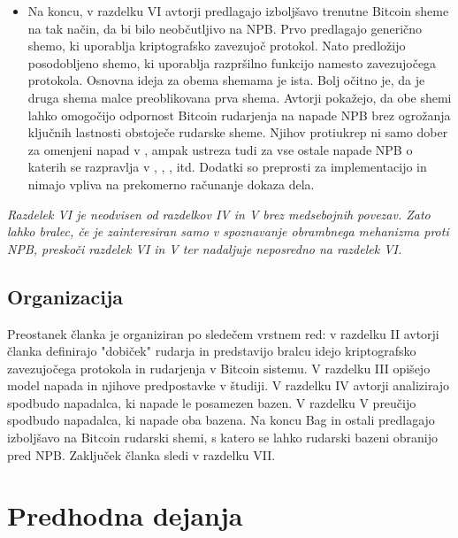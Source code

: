 \documentclass[12pt]{article}
\begin{document}
\begin{itemize}
	\item Na koncu, v razdelku VI avtorji predlagajo izboljšavo trenutne Bitcoin sheme na tak način, da bi bilo neobčutljivo na NPB. Prvo predlagajo generično shemo, ki uporablja kriptografsko zavezujoč protokol. Nato predložijo posodobljeno shemo, ki uporablja razpršilno funkcijo namesto zavezujočega protokola. Osnovna ideja za obema shemama je ista. Bolj očitno je, da je druga shema malce preoblikovana prva shema. Avtorji pokažejo, da obe shemi lahko omogočijo odpornost Bitcoin rudarjenja na napade NPB brez ogrožanja ključnih lastnosti obstoječe rudarske sheme. Njihov protiukrep ni samo dober za omenjeni napad v  \cite{originalarticle}, ampak ustreza tudi za vse ostale napade NPB o katerih se razpravlja v \cite{analysisofbitcoin}, \cite{minnersdilemma}, \cite{subversivestrategies}, itd. Dodatki so preprosti za implementacijo in nimajo vpliva na prekomerno računanje dokaza dela.
\end{itemize}

\textit{
	Razdelek VI je neodvisen od razdelkov IV in V brez medsebojnih povezav. Zato lahko bralec, če je zainteresiran samo v spoznavanje obrambnega mehanizma proti NPB, preskoči razdelek VI in V ter nadaljuje neposredno na razdelek VI. }

\subsection{Organizacija}

Preostanek članka  \cite{originalarticle} je organiziran po sledečem vrstnem red: v razdelku II avtorji članka definirajo "dobiček" rudarja in predstavijo bralcu idejo kriptografsko zavezujočega protokola in rudarjenja v Bitcoin sistemu. V razdelku III opišejo model napada in njihove predpostavke v študiji. V razdelku IV avtorji analizirajo spodbudo napadalca, ki napade le posamezen bazen. V razdelku V preučijo spodbudo napadalca, ki napade oba bazena. Na koncu Bag  \cite{originalarticle} in ostali predlagajo izboljšavo na Bitcoin rudarski shemi, s katero se lahko rudarski bazeni obranijo pred NPB. Zaključek članka sledi v razdelku VII.

\section{Predhodna dejanja}
\end{document}
